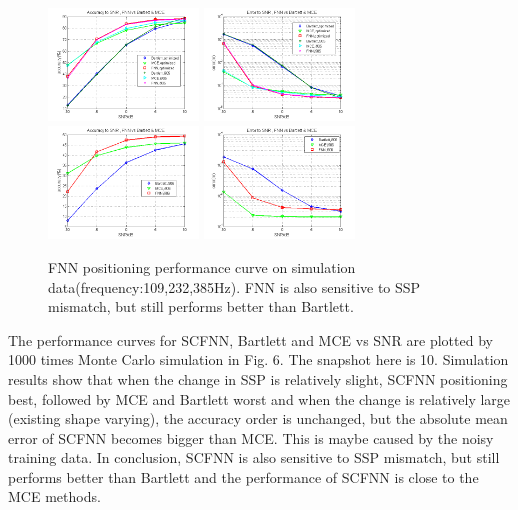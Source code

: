 \begin{figure}
\includegraphics[width=4cm,height=3cm]{figure/Accuracy_to_SNR_FNN_vs_Bartlett_MCE}
\includegraphics[width=4cm,height=3cm]{figure/Error_to_SNR_FNN_vs_Bartlett_MCE}
\includegraphics[width=4cm,height=3cm]{figure/Accuracy_to_SNR_FNN_vs_Bartlett_MCE_i906}
\includegraphics[width=4cm,height=3cm]{figure/Error_to_SNR_FNN_vs_Bartlett_MCE_i906}
\caption{FNN positioning performance curve on simulation data(frequency:109,232,385Hz).
 FNN is also sensitive to SSP mismatch, but still performs better than Bartlett.
}
\end{figure}
The performance curves for SCFNN, Bartlett and MCE vs SNR are plotted by 1000 times Monte Carlo simulation in Fig. 6. The snapshot here is 10.
Simulation results show that when the change in SSP is relatively slight, SCFNN positioning best, followed by MCE and Bartlett worst and when the change is relatively large (existing shape varying), the accuracy order is unchanged, but the absolute mean error of SCFNN becomes bigger than MCE.
This is maybe caused by the noisy training data.
In conclusion, SCFNN is also sensitive to SSP mismatch, but still performs better than Bartlett and the performance of SCFNN is close to the MCE methods.
